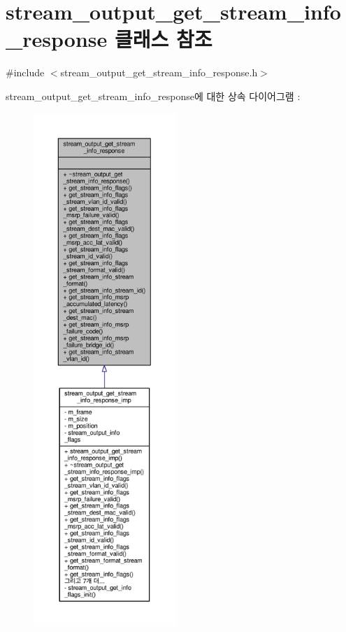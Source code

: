 \hypertarget{classavdecc__lib_1_1stream__output__get__stream__info__response}{}\section{stream\+\_\+output\+\_\+get\+\_\+stream\+\_\+info\+\_\+response 클래스 참조}
\label{classavdecc__lib_1_1stream__output__get__stream__info__response}


{\ttfamily \#include $<$stream\+\_\+output\+\_\+get\+\_\+stream\+\_\+info\+\_\+response.\+h$>$}



stream\+\_\+output\+\_\+get\+\_\+stream\+\_\+info\+\_\+response에 대한 상속 다이어그램 \+: 
\nopagebreak
\begin{figure}[H]
\begin{center}
\leavevmode
\includegraphics[height=550pt]{classavdecc__lib_1_1stream__output__get__stream__info__response__inherit__graph}
\end{center}
\end{figure}


